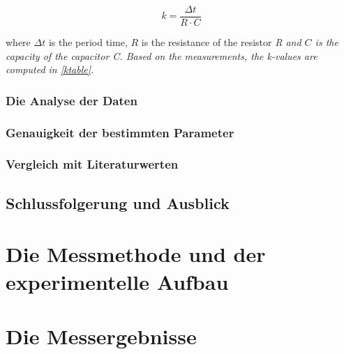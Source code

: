 \documentclass[journal]{IEEEtran}
\begin{document}
\begin{equation}
	k = \frac{\Delta t}{R \cdot C}
\end{equation}

where $\Delta t$ is the period time, $R$ is the resistance of the resistor
\em{R} and $C$ is the capacity of the capacitor \em{C}. Based on the
measurements, the k-values are computed in \ref{ktable}.

\subsubsection{Die Analyse der Daten}

\subsubsection{Genauigkeit der bestimmten Parameter}

\subsubsection{Vergleich mit Literaturwerten}

\subsection{Schlussfolgerung und Ausblick }

\section{Die Messmethode und der experimentelle Aufbau}

\section{Die Messergebnisse}
\end{document}
